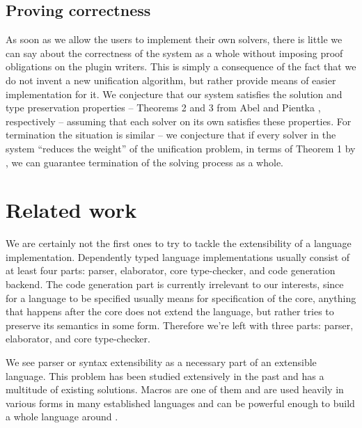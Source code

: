 \hypertarget{proving-correctness}{%
\subsection{Proving correctness}\label{proving-correctness}}

As soon as we allow the users to implement their own solvers, there is
little we can say about the correctness of the system as a whole without
imposing proof obligations on the plugin writers. This is simply a
consequence of the fact that we do not invent a new unification
algorithm, but rather provide means of easier implementation for it. We
conjecture that our system satisfies the solution and type preservation
properties -- Theorems 2 and 3 from
Abel and Pientka \cite{abelHigherOrderDynamicPattern2011}, respectively -- assuming that
each solver on its own satisfies these properties. For termination the
situation is similar -- we conjecture that if every solver in the system
``reduces the weight'' of the unification problem, in terms of Theorem 1
by \citet{abelHigherOrderDynamicPattern2011}, we can guarantee
termination of the solving process as a whole.

\hypertarget{sec:related_work}{%
\section{Related work}\label{sec:related_work}}

We are certainly not the first ones to try to tackle the extensibility
of a language implementation. Dependently typed language implementations
usually consist of at least four parts: parser, elaborator, core
type-checker, and code generation backend. The code generation part is
currently irrelevant to our interests, since for a language to be
specified usually means for specification of the core, anything that
happens after the core does not extend the language, but rather tries to
preserve its semantics in some form. Therefore we're left with three
parts: parser, elaborator, and core type-checker.

We see parser or syntax extensibility as a necessary part of an
extensible language. This problem has been studied extensively in the
past and has a multitude of existing solutions. Macros are one of them
and are used heavily in various forms in many established languages
\citep{thecoqdevelopmentteamCoqProofAssistant2022, theagdateamAgdaUserManual2023a, ullrichNotationsHygienicMacro2020}
and can be powerful enough to build a whole language around
\citep{changDependentTypeSystems2019}.

